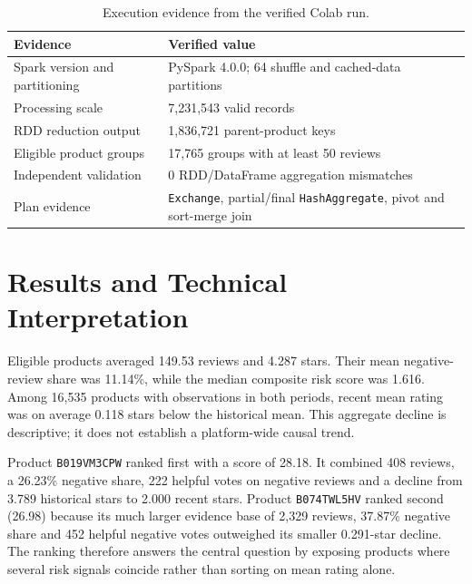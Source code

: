 \documentclass[10pt,a4paper]{article}
\begin{document}
\begin{table}[H]
\centering\small
\caption{Execution evidence from the verified Colab run.}
\begin{tabularx}{\textwidth}{@{}lY@{}}\toprule
Evidence & Verified value \\\midrule
Spark version and partitioning & PySpark 4.0.0; 64 shuffle and cached-data partitions \\
Processing scale & 7,231,543 valid records \\
RDD reduction output & 1,836,721 parent-product keys \\
Eligible product groups & 17,765 groups with at least 50 reviews \\
Independent validation & 0 RDD/DataFrame aggregation mismatches \\
Plan evidence & \texttt{Exchange}, partial/final \texttt{HashAggregate}, pivot and sort-merge join \\\bottomrule
\end{tabularx}
\end{table}

\newpage
\section{Results and Technical Interpretation}

Eligible products averaged 149.53 reviews and 4.287 stars. Their mean negative-review share was 11.14\%, while the median composite risk score was 1.616. Among 16,535 products with observations in both periods, recent mean rating was on average 0.118 stars below the historical mean. This aggregate decline is descriptive; it does not establish a platform-wide causal trend.

Product \texttt{B019VM3CPW} ranked first with a score of 28.18. It combined 408 reviews, a 26.23\% negative share, 222 helpful votes on negative reviews and a decline from 3.789 historical stars to 2.000 recent stars. Product \texttt{B074TWL5HV} ranked second (26.98) because its much larger evidence base of 2,329 reviews, 37.87\% negative share and 452 helpful negative votes outweighed its smaller 0.291-star decline. The ranking therefore answers the central question by exposing products where several risk signals coincide rather than sorting on mean rating alone.
\end{document}
